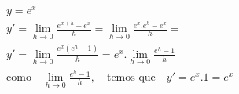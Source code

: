 \begin{ex}
\begin{align}
&y=e^x\nonumber\\
&y'=\lim_{h\rightarrow 0} \frac{e^{x+h}-e^x}{h}=\lim_{h\rightarrow 0} \frac{e^x.e^h-e^x}{h}=\nonumber\\
&y'=\lim_{h\rightarrow 0} \frac{e^x(e^h-1)}{h}=e^x.\lim_{h\rightarrow 0} \frac{e^h-1}{h}\nonumber\\
&\text{como}\quad \lim_{h\rightarrow 0} \frac{e^h-1}{h},\quad\text{temos que}\quad y'=e^x.1=e^x\nonumber
\end{align}
\end{ex}